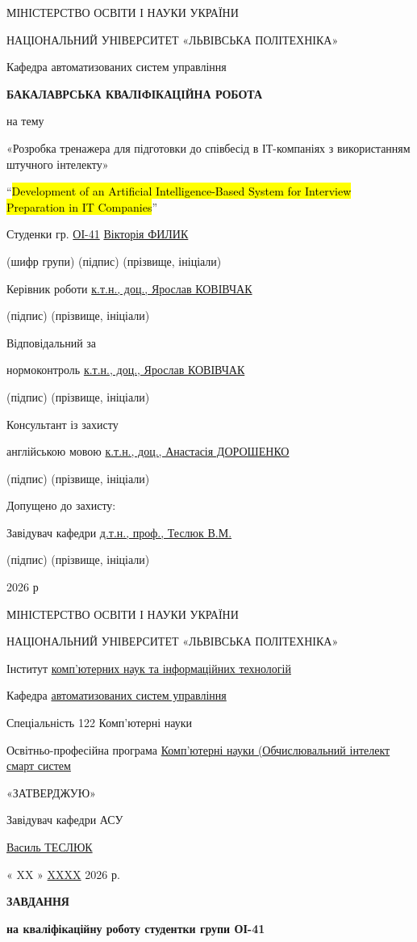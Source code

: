\documentclass[
]{article}
\author{}
\date{}
\begin{document}
МІНІСТЕРСТВО ОСВІТИ І НАУКИ УКРАЇНИ

НАЦІОНАЛЬНИЙ УНІВЕРСИТЕТ «ЛЬВІВСЬКА ПОЛІТЕХНІКА»

Кафедра автоматизованих систем управління

\textbf{БАКАЛАВРСЬКА КВАЛІФІКАЦІЙНА РОБОТА}

на тему

«Розробка тренажера для підготовки до співбесід в ІТ-компаніях з
використанням штучного інтелекту»

``\hl{Development of an Artificial Intelligence-Based System for
Interview Preparation in IT Companies}''

Студенки гр. \ul{ОІ-41} \ul{Вікторія ФИЛИК}

(шифр групи) (підпис) (прізвище, ініціали)

Керівник роботи \ul{к.т.н., доц., Ярослав КОВІВЧАК}

(підпис) (прізвище, ініціали)

Відповідальний за

нормоконтроль \ul{к.т.н., доц., Ярослав КОВІВЧАК}

(підпис) (прізвище, ініціали)

Консультант із захисту

англійською мовою \ul{к.т.н., доц., Анастасія ДОРОШЕНКО}

(підпис) (прізвище, ініціали)

Допущено до захисту:

Завідувач кафедри \ul{д.т.н., проф., Теслюк В.М.}

(підпис) (прізвище, ініціали)

2026 р

МІНІСТЕРСТВО ОСВІТИ І НАУКИ УКРАЇНИ

НАЦІОНАЛЬНИЙ УНІВЕРСИТЕТ «ЛЬВІВСЬКА ПОЛІТЕХНІКА»

Інститут \ul{комп'ютерних наук та інформаційних технологій}

Кафедра \ul{автоматизованих систем управління}

Спеціальність 122 Комп'ютерні науки

Освітньо-професійна програма \ul{Комп'ютерні науки (Обчислювальний
інтелект смарт систем}

«ЗАТВЕРДЖУЮ»

Завідувач кафедри АСУ

\ul{Василь ТЕСЛЮК}

« XX » \ul{XXXX} 2026 р.

\textbf{ЗАВДАННЯ}

\textbf{на кваліфікаційну роботу студентки групи ОІ-41}
\end{document}
